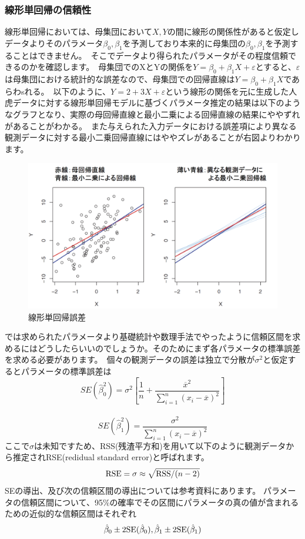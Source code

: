 \documentclass[uplatex]{jsarticle}
\begin{document}
\subsubsection{線形単回帰の信頼性}
線形単回帰においては、母集団において$X, Y$の間に線形の関係性があると仮定しデータよりそのパラメータ$\beta_0, \beta_1$を予測しており本来的に母集団の$\beta_0, \beta_1$を予測することはできません。\
そこでデータより得られたパラメータがその程度信頼できるのかを確認します。\
母集団でのXとYの関係を$Y = \beta_0 + \beta_1X + \varepsilon$とすると、$\varepsilon$は母集団における統計的な誤差なので、母集団での回帰直線は$Y=\beta_0 + \beta_1X$であらわsれる。\
以下のように、$Y = 2 + 3X + \varepsilon$という線形の関係を元に生成した人虎データに対する線形単回帰モデルに基づくパラメータ推定の結果は以下のようなグラフとなり、実際の母回帰直線と最小二乗による回帰直線の結果にややずれがあることがわかる。\
また与えられた入力データにおける誤差項により異なる観測データに対する最小二乗回帰直線にはややズレがあることが右図よりわかります。
\begin{figure}
  \begin{center}
    \includegraphics[width=13cm]{img/lienar_error.png}
    \caption{線形単回帰誤差}
  \end{center}
\end{figure}
では求められたパラメータより基礎統計や数理手法でやったように信頼区間を求めるにはどうしたらいいのでしょうか。そのためにまず各パラメータの標準誤差を求める必要があります。\
個々の観測データの誤差は独立で分散が$\sigma ^2$と仮定するとパラメータの標準誤差は
$$SE(\hat{\beta}_0^2) = \sigma^2 \left[\frac{1}{n} + \frac{\overline{x}^2}{\sum_{i=1}^n (x_i - \overline{x})^2}\right]$$\
$$SE(\hat{\beta}_1 ^2) = \frac{\sigma^2}{\sum_{i=1}^n (x_i - \overline{x})^2}$$
ここで$\sigma$は未知ですため、{\rm RSS}(残渣平方和)を用いて以下のように観測データから推定されRSE(redidual standard error)と呼ばれます。
$${\rm RSE} = \sigma \approx \sqrt{{\rm RSS}/(n-2)}$$
SEの導出、及び次の信頼区間の導出については参考資料にあります。
パラメータの信頼区間について、95$\%$の確率でその区間にパラメータの真の値が含まれるための近似的な信頼区間はそれぞれ
$$\hat{\beta}_0 \pm 2{\rm SE}(\hat{\beta}_0), \hat{\beta}_1 \pm 2{\rm SE}(\hat{\beta}_1)$$
\end{document}
